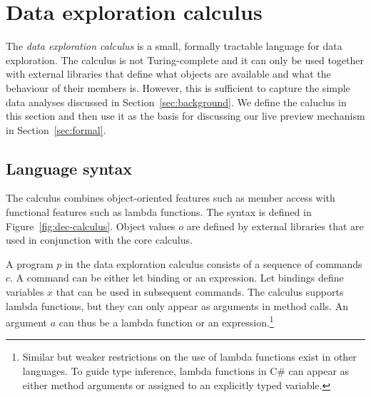 \documentclass[acmsmall,anonymous,fleqn]{acmart}\settopmatter{printfolios=false,printccs=false,printacmref=false}
\theoremstyle{plain}
\theoremstyle{definition}
\begin{document}
\section{Data exploration calculus}
\label{sec:calculus}

The \emph{data exploration calculus} is a small, formally tractable language for data exploration.
The calculus is not Turing-complete and it can only be used together with external libraries that
define what objects are available and what the behaviour of their members is. However, this is
sufficient to capture the simple data analyses discussed in Section~\ref{sec:background}. We
define the caluclus in this section and then use it as the basis for discussing our live preview
mechanism in Section~\ref{sec:formal}.

\subsection{Language syntax}
The calculus combines object-oriented features such as member access with functional features
such as lambda functions. The syntax is defined in Figure~\ref{fig:dec-calculus}. Object values
$o$ are defined by external libraries that are used in conjunction with the core calculus.

A program $p$ in the data exploration calculus consists of a sequence of commands $c$. A command
can be either let binding or an expression. Let bindings define variables $x$ that can be used in
subsequent commands. The calculus supports lambda functions, but they
can only appear as arguments in method calls. An argument $a$ can thus be a lambda
function or an expression.\footnote{Similar but weaker restrictions on the use of lambda functions
exist in other languages. To guide type inference, lambda functions in C\# can appear as either
method arguments or assigned to an explicitly typed variable.}
\end{document}
